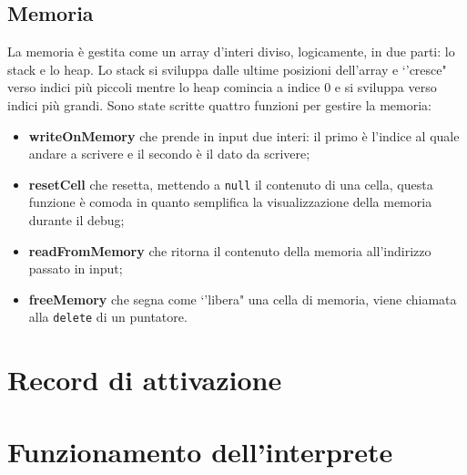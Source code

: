 \documentclass[../main.tex]{subfiles}
\begin{document}
\subsection{Memoria}
La memoria \`e gestita come un array d'interi diviso, logicamente, in due parti: lo stack e lo heap. Lo stack si sviluppa dalle ultime posizioni dell'array e `'cresce" verso indici pi\`u piccoli mentre lo heap comincia a indice 0 e si sviluppa verso indici pi\`u grandi. Sono state scritte quattro funzioni per gestire la memoria:
\begin{itemize}
    \item \textbf{writeOnMemory} che prende in input due interi: il primo \`e l'indice al quale andare a scrivere e il secondo \`e il dato da scrivere;
    \item \textbf{resetCell} che resetta, mettendo a \verb|null| il contenuto di una cella, questa funzione \`e comoda in quanto semplifica la visualizzazione della memoria durante il debug;
    \item \textbf{readFromMemory} che ritorna il contenuto della memoria all'indirizzo passato in input;
    \item \textbf{freeMemory} che segna come `'libera" una cella di memoria, viene chiamata alla \verb|delete| di un puntatore.
\end{itemize}

\section{Record di attivazione}\label{s:record-di-attivazione}

\section{Funzionamento dell'interprete}\label{s:funzionamento-interprete}
\end{document}
